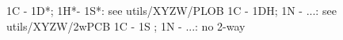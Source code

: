 1C - 1D*; 1H*- 1S*: see utils/XYZW/PLOB
1C - 1DH; 1N - ...: see utils/XYZW/2wPCB
1C - 1S ; 1N - ...: no 2-way
